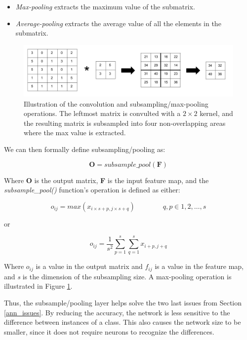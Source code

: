 \begin{itemize}
	\item \textit{Max-pooling} extracts the maximum value of the submatrix.
	\item \textit{Average-pooling} extracts the average value of all the elements in the submatrix.
\end{itemize}

\begin{figure}[h!]
  \centering
      \includegraphics[width=1.0\textwidth]{Figures/Background/Convolution-Maxpooling}
  \caption{Illustration of the convolution and subsampling/max-pooling operations. The leftmost matrix is convulted with a $ 2 \times 2 $ kernel, and the resulting matrix is subsampled into four non-overlapping areas where the max value is extracted.}
  \label{fig_conv_ss_mp}
\end{figure}

\hfill \break

We can then formally define subsampling/pooling as:

\begin{equation}
	\mathbf{O} = subsample\_pool(\mathbf{F})
\end{equation}


Where \textbf{O} is the output matrix, \textbf{F} is the input feature map, and the \textit{subsample\_pool()} function's operation is defined as either:

\begin{equation}
o_{ij} = max(x_{i \times s+p, j \times s+q}) \qquad\qquad q,p \in 1, 2, \dots, s
\end{equation}

or

\begin{equation}
o_{ij} = \frac{1}{s^2} \sum_{p=1}^{s}\sum_{q=1}^{s} x_{i+p, j+q}
\end{equation}

Where $ o_{ij} $ is a value in the output matrix and $ f_{ij} $ is a value in the feature map, and \textit{s} is the dimension of the subsampling size. A max-pooling operation is illustrated in Figure \ref{fig_conv_ss_mp}.

Thus, the subsample/pooling layer helps solve the two last issues from Section \ref{ann_issues}. By reducing the accuracy, the network is less sensitive to the difference between instances of a class. This also causes the network size to be smaller, since it does not require neurons to recognize the differences. 

